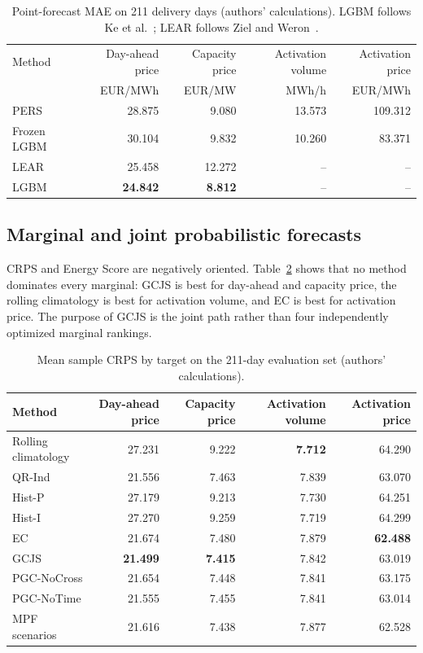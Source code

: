 \documentclass[11pt,a4paper]{article}
\begin{document}
\begin{table}[htbp]
  \centering
  \small
  \caption{Point-forecast MAE on 211 delivery days (authors' calculations).
  LGBM follows Ke et al.~\cite{ke2017lightgbm}; LEAR follows Ziel and
  Weron~\cite{zielweron2018}.}
  \begin{tabular}{lrrrr}
    \toprule
    Method & Day-ahead price & Capacity price & Activation volume & Activation price \\
      & EUR/MWh & EUR/MW & MWh/h & EUR/MWh \\
    \midrule
    PERS & 28.875 & 9.080 & 13.573 & 109.312 \\
    Frozen LGBM & 30.104 & 9.832 & 10.260 & 83.371 \\
    LEAR & 25.458 & 12.272 & -- & -- \\
    LGBM & \textbf{24.842} & \textbf{8.812} & -- & -- \\
    \bottomrule
  \end{tabular}
  \label{tab:point-forecast-results}
\end{table}

\subsection{Marginal and joint probabilistic forecasts}

CRPS and Energy Score are negatively oriented.  Table~\ref{tab:marginal-crps}
shows that no method dominates every marginal: GCJS is best for day-ahead and
capacity price, the rolling climatology is best for activation volume, and EC
is best for activation price.  The purpose of GCJS is the joint path rather
than four independently optimized marginal rankings.

\begin{table}[htbp]
  \centering
  \small
  \caption{Mean sample CRPS by target on the 211-day evaluation set
  (authors' calculations).}
  \begin{tabular}{lrrrr}
    \toprule
    Method & Day-ahead price & Capacity price & Activation volume & Activation price \\
    \midrule
    Rolling climatology & 27.231 & 9.222 & \textbf{7.712} & 64.290 \\
    QR-Ind & 21.556 & 7.463 & 7.839 & 63.070 \\
    Hist-P & 27.179 & 9.213 & 7.730 & 64.251 \\
    Hist-I & 27.270 & 9.259 & 7.719 & 64.299 \\
    EC & 21.674 & 7.480 & 7.879 & \textbf{62.488} \\
    GCJS & \textbf{21.499} & \textbf{7.415} & 7.842 & 63.019 \\
    PGC-NoCross & 21.654 & 7.448 & 7.841 & 63.175 \\
    PGC-NoTime & 21.555 & 7.455 & 7.841 & 63.014 \\
    MPF scenarios~\cite{allawati2021} & 21.616 & 7.438 & 7.877 & 62.528 \\
    \bottomrule
  \end{tabular}
  \label{tab:marginal-crps}
\end{table}
\end{document}
